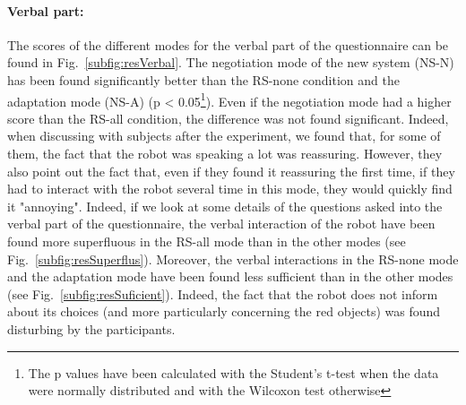 \documentclass[english,a4paper,11pt,twoside]{StyleThese}
\begin{document}
\paragraph{Verbal part:} 
The scores of the different modes for the verbal part of the questionnaire can be found in Fig.~\ref{subfig:resVerbal}. The negotiation mode of the new system (NS-N) has been found significantly better than the RS-none condition and the adaptation mode (NS-A) (p < 0.05\footnote{The p values have been calculated with the Student's t-test when the data were normally distributed and with the Wilcoxon test otherwise}). Even if the negotiation mode had a higher score than the RS-all condition, the difference was not found significant. Indeed, when discussing with subjects after the experiment, we found that, for some of them, the fact that the robot was speaking a lot was reassuring. However, they also point out the fact that, even if they found it reassuring the first time, if they had to interact with the robot several time in this mode, they would quickly find it "annoying". Indeed, if we look at some details of the questions asked into the verbal part of the questionnaire, the verbal interaction of the robot have been found more superfluous in the RS-all mode than in the other modes (see Fig.~\ref{subfig:resSuperflus}). Moreover, the verbal interactions in the RS-none mode and the adaptation mode have been found less sufficient than in the other modes (see Fig.~\ref{subfig:resSuficient}). Indeed, the fact that the robot does not inform about its choices (and more particularly concerning the red objects) was found disturbing by the participants. 
\end{document}
